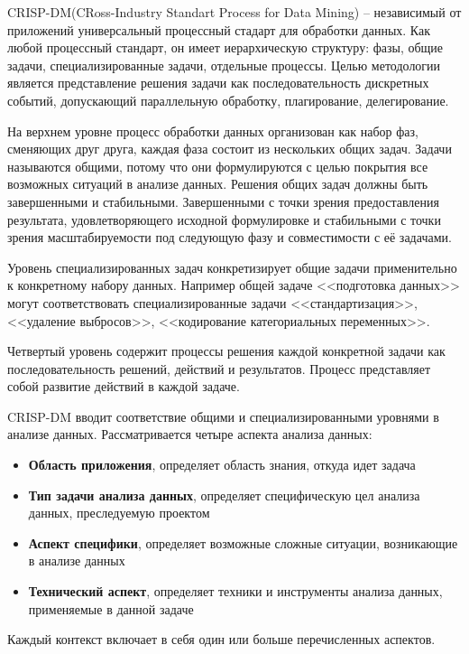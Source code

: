 CRISP-DM(CRoss-Industry Standart Process for Data Mining) -- независимый от приложений универсальный процессный стадарт для обработки данных. Как любой процессный стандарт, он имеет иерархическую структуру: фазы, общие задачи, специализированные задачи, отдельные процессы. Целью методологии является представление решения задачи как последовательность дискретных событий, допускающий параллельную обработку, плагирование, делегирование. 

На верхнем уровне процесс обработки данных организован как набор фаз, сменяющих друг друга, каждая фаза состоит из нескольких общих задач. Задачи называются общими, потому что они формулируются с целью покрытия все возможных ситуаций в анализе данных. Решения общих задач должны быть завершенными и стабильными. Завершенными с точки зрения предоставления результата, удовлетворяющего исходной формулировке и стабильными с точки зрения масштабируемости под следующую фазу и совместимости с её задачами.

Уровень специализированных задач конкретизирует общие задачи применительно к конкретному набору данных. Например общей задаче <<подготовка данных>> могут соответствовать специализированные задачи <<стандартизация>>, <<удаление выбросов>>, <<кодирование категориальных переменных>>.

Четвертый уровень содержит процессы решения каждой конкретной задачи как последовательность решений, действий и результатов. Процесс представляет собой развитие действий в каждой задаче.

CRISP-DM вводит соответствие общими и специализированными уровнями в анализе данных. Рассматривается четыре аспекта анализа данных:
\begin{itemize}
	\item \textbf{Область приложения}, определяет область знания, откуда идет задача
	\item \textbf{Тип задачи анализа данных}, определяет специфическую цел анализа данных, преследуемую проектом
	\item \textbf{Аспект специфики}, определяет возможные сложные ситуации, возникающие в анализе данных
	\item \textbf{Технический аспект}, определяет техники и инструменты анализа данных, применяемые в данной задаче 
\end{itemize}

Каждый контекст включает в себя один или больше перечисленных аспектов. 

